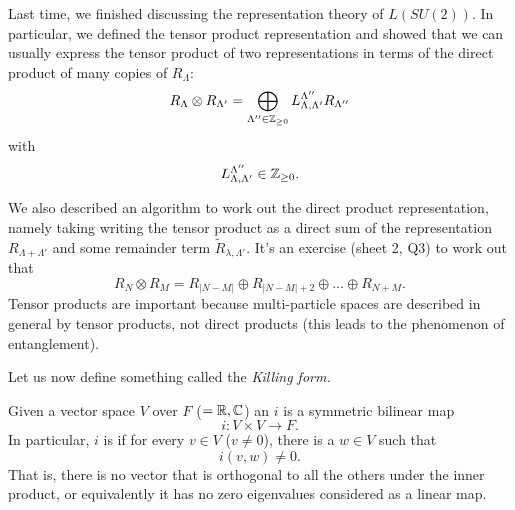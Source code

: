 Last time, we finished discussing the representation theory of $L(SU(2))$. In particular, we defined the tensor product representation and showed that we can usually express the tensor product of two representations in terms of the direct product of many copies of $R_{\Lambda}$:
$$R_\Lambda \otimes R_{\Lambda'}=\bigoplus_{\Lambda'' \in \mathbb{Z}_{\geq 0}} L^{\Lambda''}_{\Lambda,\Lambda'}R_{\Lambda''}$$
with $$L^{\Lambda''}_{\Lambda,\Lambda'}\in \mathbb{Z}_{\geq 0}.$$

We also described an algorithm to work out the direct product representation, namely taking writing the tensor product as a direct sum of the representation $R_{\Lambda+\Lambda'}$ and some remainder term $\tilde R_{\lambda,\Lambda'}.$ It's an exercise (sheet 2, Q3) to work out that
$$R_N\otimes R_M = R_{|N-M|}\oplus R_{|N-M|+2} \oplus\ldots \oplus R_{N+M}.$$
Tensor products are important because multi-particle spaces are described in general by tensor products, not direct products (this leads to the phenomenon of entanglement).

Let us now define something called the \emph{Killing form.}
\begin{defn}
Given a vector space $V$ over $F$ ($=\mathbb{R},\mathbb{C}$) an  $i$ is a symmetric bilinear map
$$i:V\times V \to F.$$
In particular, $i$ is  if for every $v\in V$ ($v\neq 0$), there is a $w\in V$ such that
$$i(v,w)\neq 0.$$ That is, there is no vector that is orthogonal to all the others under the inner product, or equivalently it has no zero eigenvalues considered as a linear map.
\end{defn}

